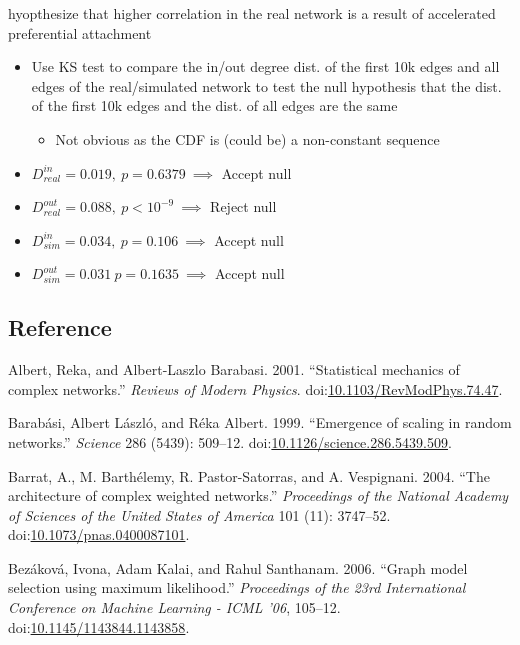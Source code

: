 \documentclass[]{elsarticle} %
\providecommand{\tightlist}{%
  \setlength{\itemsep}{0pt}\setlength{\parskip}{0pt}}
\begin{document}
hyopthesize that higher correlation in the real network is a result of
accelerated preferential attachment

\begin{itemize}
\item
  Use KS test to compare the in/out degree dist. of the first 10k edges
  and all edges of the real/simulated network to test the null
  hypothesis that the dist. of the first 10k edges and the dist. of all
  edges are the same

  \begin{itemize}
  \tightlist
  \item
    Not obvious as the CDF is (could be) a non-constant sequence
  \end{itemize}
\item
  \(D^{in}_{real} = 0.019, \ p = 0.6379 \ \implies\) Accept null
\item
  \(D^{out}_{real} = 0.088, \ p < 10^{-9} \ \implies\) Reject null
\item
  \(D^{in}_{sim} = 0.034, \ p = 0.106 \ \implies\) Accept null
\item
  \(D^{out}_{sim} = 0.031 \ p = 0.1635 \ \implies\) Accept null
\end{itemize}

\subsection{Reference}\label{reference}

\hypertarget{refs}{}
\hypertarget{ref-Albert2001}{}
Albert, Reka, and Albert-Laszlo Barabasi. 2001. ``Statistical mechanics
of complex networks.'' \emph{Reviews of Modern Physics}.
doi:\href{https://doi.org/10.1103/RevModPhys.74.47}{10.1103/RevModPhys.74.47}.

\hypertarget{ref-Barabasi1999a}{}
Barabási, Albert László, and Réka Albert. 1999. ``Emergence of scaling
in random networks.'' \emph{Science} 286 (5439): 509--12.
doi:\href{https://doi.org/10.1126/science.286.5439.509}{10.1126/science.286.5439.509}.

\hypertarget{ref-Barrat2004}{}
Barrat, A., M. Barthélemy, R. Pastor-Satorras, and A. Vespignani. 2004.
``The architecture of complex weighted networks.'' \emph{Proceedings of
the National Academy of Sciences of the United States of America} 101
(11): 3747--52.
doi:\href{https://doi.org/10.1073/pnas.0400087101}{10.1073/pnas.0400087101}.

\hypertarget{ref-Bezakova2006}{}
Bezáková, Ivona, Adam Kalai, and Rahul Santhanam. 2006. ``Graph model
selection using maximum likelihood.'' \emph{Proceedings of the 23rd
International Conference on Machine Learning - ICML '06}, 105--12.
doi:\href{https://doi.org/10.1145/1143844.1143858}{10.1145/1143844.1143858}.
\end{document}
